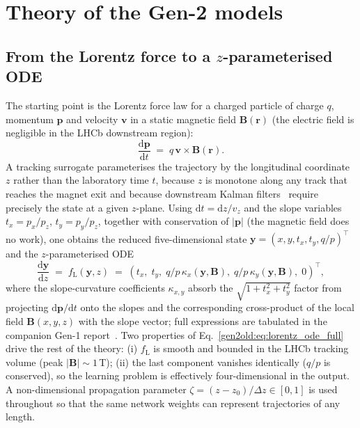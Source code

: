 \documentclass[a4paper,11pt]{article}
\newcommand{\qop}{q/p}
\newcommand{\dz}{\Delta z}
\newcommand{\state}{\mathbf{y}}
\begin{document}
\section{Theory of the Gen-2 models}\label{gen2old:sec:theory}

\subsection{From the Lorentz force to a $z$-parameterised ODE}\label{gen2old:sub:lorentz_derivation}

The starting point is the Lorentz force law for a charged particle of
charge $q$, momentum $\mathbf{p}$ and velocity $\mathbf{v}$ in a
static magnetic field $\mathbf{B}(\mathbf{r})$ (the electric field is
negligible in the LHCb downstream region):
\begin{equation}\label{gen2old:eq:lorentz_force}
  \frac{\mathrm{d}\mathbf{p}}{\mathrm{d}t} \;=\; q\,\mathbf{v}\times\mathbf{B}(\mathbf{r}).
\end{equation}
A tracking surrogate parameterises the trajectory by the longitudinal
coordinate $z$ rather than the laboratory time $t$, because $z$ is
monotone along any track that reaches the magnet exit and because
downstream Kalman filters~\cite{fruhwirth1987} require precisely the
state at a given $z$-plane. Using $\mathrm{d}t = \mathrm{d}z/v_z$ and
the slope variables $t_x = p_x/p_z$, $t_y = p_y/p_z$, together with
conservation of $|\mathbf{p}|$ (the magnetic field does no work), one
obtains the reduced five-dimensional state
$\state = (x,y,t_x,t_y,\qop)^\top$ and the $z$-parameterised ODE
\begin{equation}\label{gen2old:eq:lorentz_ode_full}
  \frac{\mathrm{d}\state}{\mathrm{d}z}
  \;=\;
  f_{\mathrm{L}}(\state,z)
  \;=\;
  (t_x,\; t_y,\; \qop\,\kappa_x(\state,\mathbf{B}),\; \qop\,\kappa_y(\state,\mathbf{B}),\; 0)^\top,
\end{equation}
where the slope-curvature coefficients $\kappa_{x,y}$ absorb the
$\sqrt{1+t_x^2+t_y^2}$ factor from projecting $\mathrm{d}\mathbf{p}/\mathrm{d}t$
onto the slopes and the corresponding cross-product of the local field
$\mathbf{B}(x,y,z)$ with the slope vector; full expressions are tabulated
in the companion Gen-1 report~\cite{gen1report}. Two properties of
Eq.~\ref{gen2old:eq:lorentz_ode_full} drive the rest of the theory: (i)
$f_{\mathrm{L}}$ is smooth and bounded in the LHCb tracking volume
(peak $|\mathbf{B}|\sim 1$\,T); (ii) the last component vanishes
identically ($\qop$ is conserved), so the learning problem is
effectively four-dimensional in the output. A non-dimensional
propagation parameter $\zeta = (z-z_0)/\dz\in[0,1]$ is used throughout so
that the same network weights can represent trajectories of any length.
\end{document}
